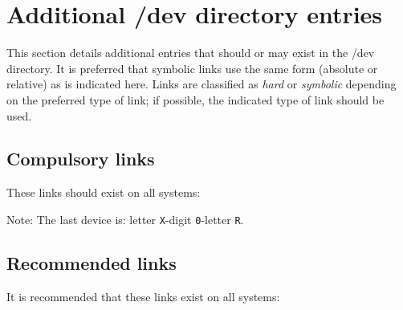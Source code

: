 \begin{devicelist}
\end{devicelist}

\begin{devicelist}
\end{devicelist}

\section{Additional /dev directory entries}

This section details additional entries that should or may exist in the
{\file /dev} directory.  It is preferred that symbolic links use the
same form (absolute or relative) as is indicated here.  Links are
classified as {\em hard\/} or {\em symbolic\/} depending on the
preferred type of link; if possible, the indicated type of link should
be used.

\subsection{Compulsory links}

These links should exist on all systems:

\begin{nodelist}
\end{nodelist}

\noindent
Note: The last device is: letter {\tt X}-digit {\tt 0}-letter {\tt R}.

\subsection{Recommended links}

It is recommended that these links exist on all systems:

\begin{nodelist}
\end{nodelist}

